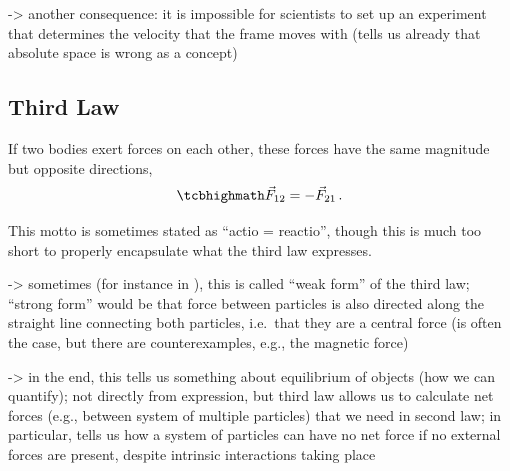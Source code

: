 \documentclass[../class_mech_main.tex]{subfiles}
\begin{document}


-> another consequence: it is impossible for scientists to set up an experiment that determines the velocity that the frame moves with (tells us already that absolute space is wrong as a concept)



		\subsection{Third Law}
\begin{axiom}
	\centering
	If two bodies exert forces on each other, these forces have the same magnitude but opposite directions,
	\begin{equation}\label{eq:newton_third_law}
		\eqbox{
			\vec{F}_{12} = - \vec{F}_{21}
		} \, .
	\end{equation}
\end{axiom}
This motto is sometimes stated as \enquote{actio = reactio}, though this is much too short to properly encapsulate what the third law expresses.


-> sometimes (for instance in \cite{Thornton_2003}), this is called \enquote{weak form} of the third law; \enquote{strong form} would be that force between particles is also directed along the straight line connecting both particles, i.e.~that they are a central force (is often the case, but there are counterexamples, e.g., the magnetic force)


-> in the end, this tells us something about equilibrium of objects (how we can quantify); not directly from expression, but third law allows us to calculate net forces (e.g., between system of multiple particles) that we need in second law; in particular, tells us how a system of particles can have no net force if no external forces are present, despite intrinsic interactions taking place
\end{document}
